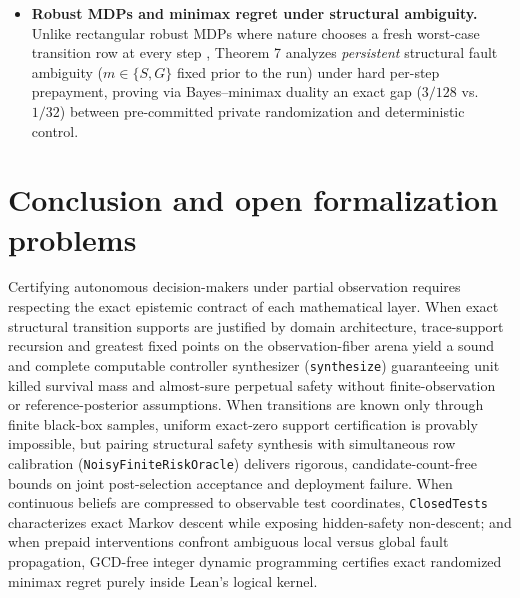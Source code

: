 \documentclass[11pt,a4paper]{article}
\begin{document}
\begin{itemize}
  indistinguishability bound \citep{leCam1973, tsybakov2009} tailored to
  support-shield soundness. Theorem 5 complements selective inference
  \citep{berk2013} and PAC-MDP bounds
  \citep{kearnsSingh2002, strehl2009, abbasiYadkori2011} by showing that
  simultaneous microscopic row calibration controls fiber
  row-discrepancies across arbitrary finite candidate families without
  \(m\)-union penalties in total variation (unlike kernel MMD
  \citep{gretton2012}, which requires smoothness to bound indicator
  failure events).
\item
  \textbf{Robust MDPs and minimax regret under structural ambiguity.}
  Unlike rectangular robust MDPs where nature chooses a fresh worst-case
  transition row at every step \citep{nilimElGhaoui2005, wiesemann2013},
  Theorem 7 analyzes \emph{persistent} structural fault ambiguity
  (\(m \in \{S, G\}\) fixed prior to the run) under hard per-step
  prepayment, proving via Bayes--minimax duality
  \citep{vonNeumann1928, wald1950, savage1951} an exact gap (\(3/128\)
  vs.~\(1/32\)) between pre-committed private randomization and
  deterministic control.
\end{itemize}

\section{Conclusion and open formalization
problems}\label{conclusion-and-open-formalization-problems}

Certifying autonomous decision-makers under partial observation requires
respecting the exact epistemic contract of each mathematical layer. When
exact structural transition supports are justified by domain
architecture, trace-support recursion and greatest fixed points on the
observation-fiber arena yield a sound and complete computable controller
synthesizer (\texttt{synthesize}) guaranteeing unit killed survival mass
and almost-sure perpetual safety without finite-observation or
reference-posterior assumptions. When transitions are known only through
finite black-box samples, uniform exact-zero support certification is
provably impossible, but pairing structural safety synthesis with
simultaneous row calibration (\texttt{NoisyFiniteRiskOracle}) delivers
rigorous, candidate-count-free bounds on joint post-selection acceptance
and deployment failure. When continuous beliefs are compressed to
observable test coordinates, \texttt{ClosedTests} characterizes exact
Markov descent while exposing hidden-safety non-descent; and when
prepaid interventions confront ambiguous local versus global fault
propagation, GCD-free integer dynamic programming certifies exact
randomized minimax regret purely inside Lean's logical kernel.
\end{document}
